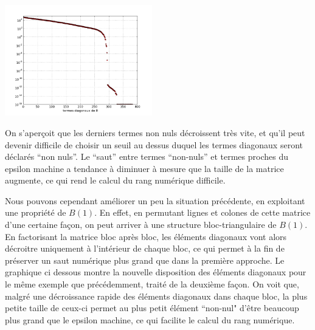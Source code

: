 \documentclass{standalone}
\begin{document}
  \begin{center}
    \includegraphics[width=0.48\textwidth]{../png/diagR.png}
  \end{center}
 On s'aperçoit que les derniers termes non nuls décroissent très vite, et qu'il peut devenir difficile de choisir un seuil au dessus duquel les termes diagonaux seront déclarés ``non nuls''. Le ``saut'' entre termes ``non-nuls'' et termes proches du epsilon machine a tendance à diminuer à mesure que la taille de la matrice augmente, ce qui rend le calcul du rang numérique difficile.


Nous pouvons cependant améliorer un peu la situation précédente, en exploitant une propriété de $B(1)$. En effet, en permutant lignes et colones de cette matrice d'une certaine façon, on peut arriver à une structure bloc-triangulaire de $B(1)$.
En factorisant la matrice bloc après bloc, les éléments diagonaux vont alors décroitre uniquement à l'intérieur de chaque bloc, ce qui permet à la fin de préserver un saut numérique plus grand que dans la première approche. Le graphique ci dessous montre la nouvelle disposition des éléments diagonaux pour le même exemple que précédemment, traité de la deuxième façon.
On voit que, malgré une décroissance rapide des éléments diagonaux dans chaque bloc, la plus petite taille de ceux-ci permet au plus petit élément ``non-nul" d'être beaucoup plus grand que le epsilon machine, ce qui facilite le calcul du rang numérique.
\end{document}
